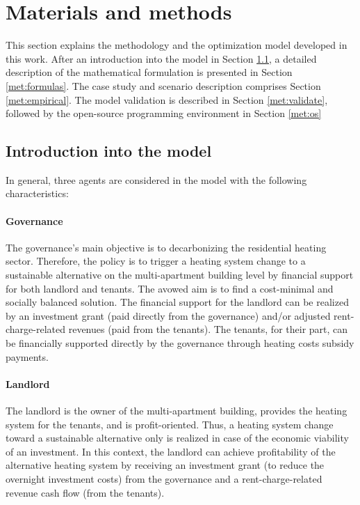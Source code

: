 \section{Materials and methods}\label{methodology}
This section explains the methodology and the optimization model developed in this work. After an introduction into the model in Section \ref{met:intro}, a detailed description of the mathematical formulation is presented in Section \ref{met:formulas}. The case study and scenario description comprises Section \ref{met:empirical}. The model validation is described in Section \ref{met:validate}, followed by the open-source programming environment in Section \ref{met:os}

\subsection{Introduction into the model}\label{met:intro}
In general, three agents are considered in the model with the following characteristics:
\paragraph{Governance} The governance's main objective is to decarbonizing the residential heating sector. Therefore, the policy is to trigger a heating system change to a sustainable alternative on the multi-apartment building level by financial support for both landlord and tenants. The avowed aim is to find a cost-minimal and socially balanced solution. The financial support for the landlord can be realized by an investment grant (paid directly from the governance) and/or adjusted rent-charge-related revenues (paid from the tenants). The tenants, for their part, can be financially supported directly by the governance through heating costs subsidy payments. 
\paragraph{Landlord} The landlord is the owner of the multi-apartment building, provides the heating system for the tenants, and is profit-oriented. Thus, a heating system change toward a sustainable alternative only is realized in case of the economic viability of an investment. In this context, the landlord can achieve profitability of the alternative heating system by receiving an investment grant (to reduce the overnight investment costs) from the governance and a rent-charge-related revenue cash flow (from the tenants). 

